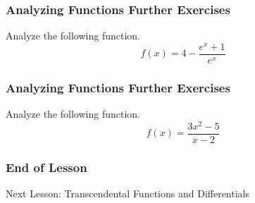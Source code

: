 \documentclass[xcolor=dvipsnames]{beamer}
\begin{document}
\begin{frame}
  \frametitle{Analyzing Functions Further Exercises}
{\ubung} Analyze the following function.
\begin{equation}
  \label{eq:ahkeique}
  f(x)=4-\frac{e^{x}+1}{e^{x}}
\end{equation}
\end{frame}

\begin{frame}
  \frametitle{Analyzing Functions Further Exercises}
{\ubung} Analyze the following function.
\begin{equation}
  \label{eq:mohsixox}
  f(x)=\frac{3x^{2}-5}{x-2}
\end{equation}
\end{frame}

\begin{frame}
  \frametitle{End of Lesson}
Next Lesson: Transcendental Functions and Differentials
\end{frame}
\end{document}
